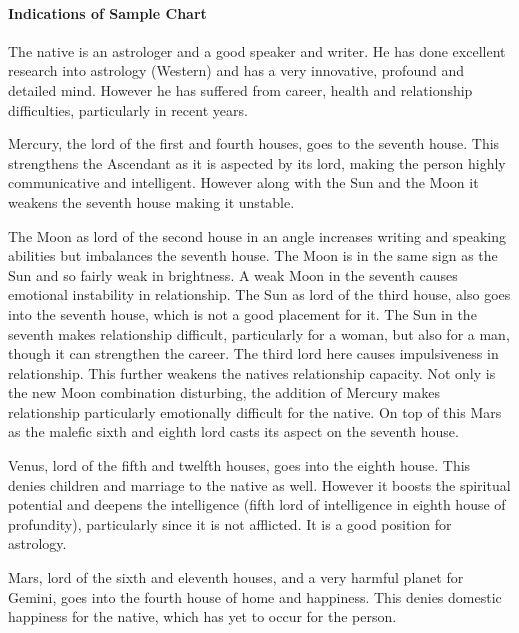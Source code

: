 \paragraph{Indications of Sample Chart}

 

The native is an astrologer and a good speaker and writer. He has done excellent research into astrology (Western) and has a very innovative, profound and detailed mind. However he has suffered from career, health and relationship difficulties, particularly in recent years.

 

Mercury, the lord of the first and fourth houses, goes to the seventh house. This strengthens the Ascendant as it is aspected by its lord, making the person highly communicative and intelligent. However along with the Sun and the Moon it weakens the seventh house making it unstable.

 

The Moon as lord of the second house in an angle increases writing and speaking abilities but imbalances the seventh house. The Moon is in the same sign as the Sun and so fairly weak in brightness. A weak Moon in the seventh causes emotional instability in relationship. The Sun as lord of the third house, also goes into the seventh house, which is not a good placement for it. The Sun in the seventh makes relationship difficult, particularly for a woman, but also for a man, though it can strengthen the career. The third lord here causes impulsiveness in relationship. This further weakens the natives relationship capacity. Not only is the new Moon combination disturbing, the addition of Mercury makes relationship particularly emotionally difficult for the native. On top of this Mars as the malefic sixth and eighth lord casts its aspect on the seventh house.

 

Venus, lord of the fifth and twelfth houses, goes into the eighth house. This denies children and marriage to the native as well. However it boosts the spiritual potential and deepens the intelligence (fifth lord of intelligence in eighth house of profundity), particularly since it is not afflicted. It is a good position for astrology.

 

Mars, lord of the sixth and eleventh houses, and a very harmful planet for Gemini, goes into the fourth house of home and happiness. This denies domestic happiness for the native, which has yet to occur for the person.

